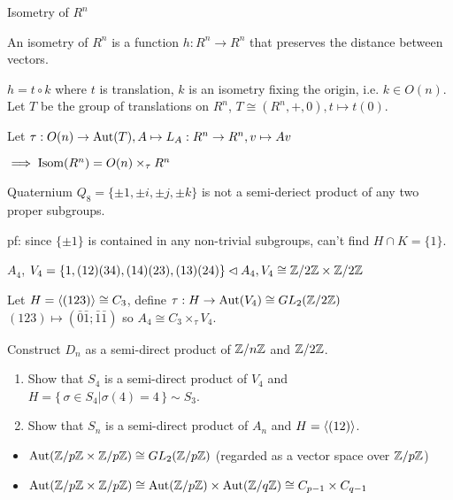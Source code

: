 \begin{example}
Isometry of $R^n$
\end{example}

\begin{definition}[Isometry]
An isometry of $R^n$ is a function $h: R^n \to R^n$ that preserves the distance between vectors.
\end{definition}
$h = t \circ k$ where $t$ is translation, $k$ is an isometry fixing the origin, i.e. $k \in O(n)$.
Let $T$ be the group of translations on $R^n$, $T \cong (R^n, +, 0), t \mapsto t(0)$.

Let $\tau : O(n) \to \operatorname{Aut}(T), A \mapsto L_A : R^n \to R^n, v \mapsto Av$

$\implies \operatorname{Isom}(R^n) = O(n) \times_\tau R^n$

\begin{example}
Quaternium $Q_8 = \{\pm 1, \pm i, \pm j, \pm k\}$ is not a semi-deriect product of any two proper subgroups.
\end{example}
pf: since $\{\pm 1\}$ is contained in any non-trivial subgroups, can't find $H \cap K = \{1\}$.

\begin{example}
  $A_4$, $V_4 = \{1, (12)(34), (14)(23), (13)(24)\} \lhd A_4, V_4 \cong {\mathbb{Z}}/{2\mathbb{Z}} \times {\mathbb{Z}}/{2\mathbb{Z}}$
\end{example}
Let $H = \langle(123)\rangle \cong C_3$, define $\tau : H \to \operatorname{Aut}(V_4) \cong GL_2({\mathbb{Z}}/{2\mathbb{Z}})$
$(123) \mapsto (\bar{0} \bar{1}; \bar{1} \bar{1})$
so $A_4 \cong C_3 \times_\tau V_4$.

\begin{exercise}
  Construct $D_n$ as a semi-direct product of ${\mathbb{Z}}/{n\mathbb{Z}}$ and
  ${\mathbb{Z}}/{2\mathbb{Z}}$.
\end{exercise}

\begin{exercise} \mbox{}
  \begin{enumerate}
    \item Show that $S_4$ is a semi-direct product of $V_4$ and $H = \{\, \sigma \in S_4 | \sigma(4) = 4 \,\} \sim S_3$.
    \item Show that $S_n$ is a semi-direct product of $A_n$ and $H = \langle(12)\rangle$.
  \end{enumerate}
\end{exercise}

\begin{remark} \mbox{}
  \begin{itemize}
    \item $\operatorname{Aut}({\mathbb{Z}}/{p\mathbb{Z}} \times {\mathbb{Z}}/{p\mathbb{Z}}) \cong GL_2({\mathbb{Z}}/{p\mathbb{Z}})$
      (regarded as a vector space over ${\mathbb{Z}}/{p\mathbb{Z}}$)
    \item $\operatorname{Aut}({\mathbb{Z}}/{p\mathbb{Z}} \times {\mathbb{Z}}/{p\mathbb{Z}}) \cong
      \operatorname{Aut}({\mathbb{Z}}/{p\mathbb{Z}}) \times \operatorname{Aut}({\mathbb{Z}}/{q\mathbb{Z}}) \cong
      C_{p-1} \times C_{q-1}$
  \end{itemize}
\end{remark}
